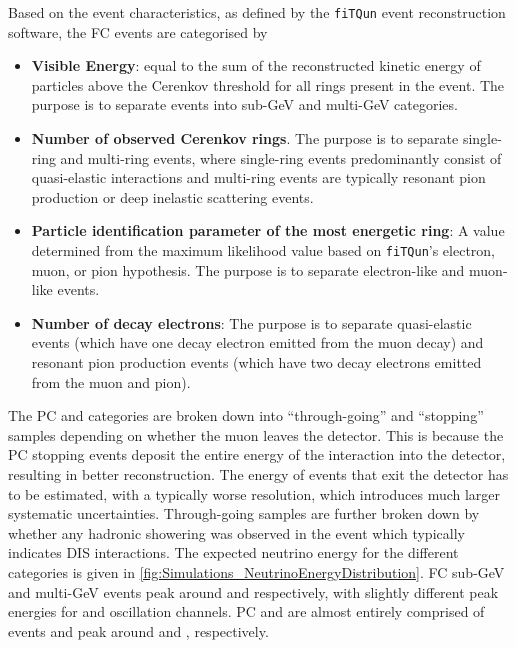 Based on the event characteristics, as defined by the \texttt{fiTQun} event reconstruction software, the FC events are categorised by

\begin{itemize}
    \item \textbf{Visible Energy}: equal to the sum of the reconstructed kinetic energy of particles above the Cerenkov threshold for all rings present in the event. The purpose is to separate events into sub-GeV and multi-GeV categories. 
    \item \textbf{Number of observed Cerenkov rings}. The purpose is to separate single-ring and multi-ring events, where single-ring events predominantly consist of quasi-elastic interactions and multi-ring events are typically resonant pion production or deep inelastic scattering events.
    \item \textbf{Particle identification parameter of the most energetic ring}: A value determined from the maximum likelihood value based on \texttt{fiTQun}'s electron, muon, or pion hypothesis. The purpose is to separate electron-like and muon-like events.
    \item \textbf{Number of decay electrons}: The purpose is to separate quasi-elastic events (which have one decay electron emitted from the muon decay) and resonant pion production events (which have two decay electrons emitted from the muon and pion).
\end{itemize}

The PC and  categories are broken down into ``through-going'' and ``stopping'' samples depending on whether the muon leaves the detector. This is because the PC stopping events deposit the entire energy of the interaction into the detector, resulting in better reconstruction. The energy of events that exit the detector has to be estimated, with a typically worse resolution, which introduces much larger systematic uncertainties. Through-going  samples are further broken down by whether any hadronic showering was observed in the event which typically indicates DIS interactions. The expected neutrino energy for the different categories is given in \autoref{fig:Simulations_NeutrinoEnergyDistribution}. FC sub-GeV and multi-GeV events peak around  and  respectively, with slightly different peak energies for  and \quickmath{\nu_{\mu}} oscillation channels. PC and  are almost entirely comprised of \quickmath{\nu_{\mu}} events and peak around  and , respectively.

